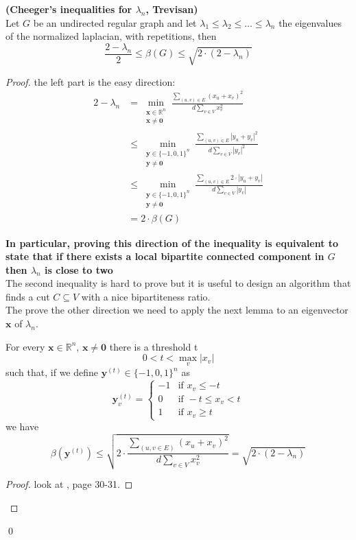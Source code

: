 \begin{theorem}{\textbf{(Cheeger's inequalities for $ \lambda_n $, Trevisan)}}
\\
Let $ G $ be an undirected regular graph and let $ \lambda_1 \leq \lambda_2 \leq \dots \leq \lambda_n $ the eigenvalues of the normalized laplacian, with repetitions, then
\[\frac{2-\lambda_n}{2} \leq \beta(G) \leq \sqrt{2 \cdot (2-\lambda_n)} \] 
\begin{proof}
the left part is the easy direction:
\begin{align*}
 2-\lambda_n & = \min_{\substack{\mathbf{x} \in \mathbb{R}^n \\ \mathbf{x} \ne \mathbf{0}}} \frac{\sum_{(u,v)\in E}(x_u+x_v)^2}{d \sum_{v \in V} x_v^2 } \\
 & \leq \min_{\substack{\mathbf{y} \in \{-1,0,1\}^n \\ \mathbf{y} \ne \mathbf{0}}} \frac{\sum_{(u,v)\in E} |y_u+y_v|^2}{d \sum_{v \in V} |y_v|^2 } \\
 & \leq \min_{\substack{\mathbf{y} \in \{-1,0,1\}^n \\ \mathbf{y} \ne \mathbf{0}}} \frac{\sum_{(u,v)\in E} 2 \cdot |y_u+y_v|}{d \sum_{v \in V} |y_v|} \\
 & = 2 \cdot \beta(G)
\end{align*}
\medskip

\textbf{In particular, proving this direction of the inequality is equivalent to state that if there exists a local bipartite connected component in $ G $ then $ \lambda_n $ is close to two} \\
The second inequality is hard to prove but it is useful to design an algorithm that finds a cut $ C \subseteq V $ with a nice bipartiteness ratio.\\
The prove the other direction we need to apply the next lemma to an eigenvector $ \mathbf{x} $ of $ \lambda_n $.
\begin{lemma}[main]
For every $ \mathbf{x} \in \mathbb{R}^n, \,  \mathbf{x} \ne \mathbf{0} $ there is a threshold t \[ 0<t<\max_v |x_v| \] such that, if we define $ \mathbf{y}^{(t)} \in \{-1,0,1\}^n $ as
\begin{equation*}
\mathbf{y}_{v}^{(t)} = \begin{cases}
  -1 & \text{if } x_v \leq -t \\
  0 & \text{if }  -t \leq x_v < t \\
  1 & \text{if } x_v \geq t
 \end{cases}
\end{equation*}
we have
\[ \beta(\mathbf{y}^{(t)}) \leq \sqrt{2 \cdot \frac{\sum_{(u,v \in E)}(x_u+x_v)^2}{d \sum_{v \in V}x_v^2}} = \sqrt{2 \cdot (2-\lambda_n)}\]
\begin{proof}
look at \cite{trevi-notes}, page 30-31.
\end{proof}
\end{lemma}
\end{proof}
\qed
\end{theorem}

